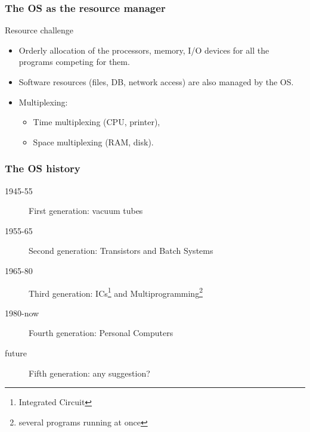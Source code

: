   \begin{frame}
    \frametitle{The OS as the resource manager}
        \begin{block}{Resource challenge}
          \begin{itemize}
            \item Orderly allocation of the processors, memory, I/O devices for all the programs competing for them.
            \item Software resources (files, DB, network access) are also managed by the OS.
            \item Multiplexing:
              \begin{itemize}
                \item Time multiplexing (CPU, printer),
                \item Space multiplexing (RAM, disk).
              \end{itemize}
          \end{itemize}
        \end{block}
  \end{frame}

  \begin{frame}
    \frametitle{The OS history}
        \begin{block}{}
          \begin{description}
            \item[1945-55] First generation: vacuum tubes
            \item[1955-65] Second generation: Transistors and Batch Systems
            \item[1965-80] Third generation: ICs\footnote{Integrated Circuit} and Multiprogramming\footnote{several programs running at once}
            \item[1980-now] Fourth generation: Personal Computers
            \item[future] Fifth generation: any suggestion?
          \end{description}
        \end{block}
  \end{frame}


